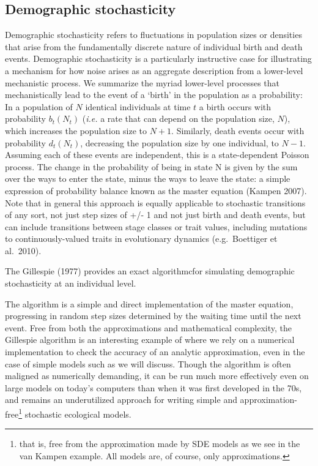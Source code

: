 \documentclass[
  authoryear,
  preprint]{elsarticle}
\begin{document}
\subsection{Demographic stochasticity}\label{demographic-stochasticity}

Demographic stochasticity refers to fluctuations in population sizes or
densities that arise from the fundamentally discrete nature of
individual birth and death events. Demographic stochasticity is a
particularly instructive case for illustrating a mechanism for how noise
arises as an aggregate description from a lower-level mechanistic
process. We summarize the myriad lower-level processes that
mechanistically lead to the event of a `birth' in the population as a
probability: In a population of \(N\) identical individuals at time \(t%
\) a birth occurs with probability \(b_t(N_t)\) (\emph{i.e.} a rate that
can depend on the population size, \(N\)), which increases the
population size to \(N+1\). Similarly, death events occur with
probability \(d_t(N_t)\), decreasing the population size by one
individual, to \(N-1\). Assuming each of these events are independent,
this is a state-dependent Poisson process. The change in the probability
of being in state N is given by the sum over the ways to enter the
state, minus the ways to leave the state: a simple expression of
probability balance known as the master equation (Kampen 2007). Note
that in general this approach is equally applicable to stochastic
transitions of any sort, not just step sizes of +/- 1 and not just birth
and death events, but can include transitions between stage classes or
trait values, including mutations to continuously-valued traits in
evolutionary dynamics (e.g.~Boettiger et al.~2010).

The Gillespie (1977) provides an exact algorithmcfor simulating
demographic stochasticity at an individual level.

The algorithm is a simple and direct implementation of the master
equation, progressing in random step sizes determined by the waiting
time until the next event. Free from both the approximations and
mathematical complexity, the Gillespie algorithm is an interesting
example of where we rely on a numerical implementation to check the
accuracy of an analytic approximation, even in the case of simple models
such as we will discuss. Though the algorithm is often maligned as
numerically demanding, it can be run much more effectively even on large
models on today's computers than when it was first developed in the 70s,
and remains an underutilized approach for writing simple and
approximation-free\footnote{that is, free from the approximation made by
  SDE models as we see in the van Kampen example. All models are, of
  course, only approximations.} stochastic ecological models.
\end{document}

